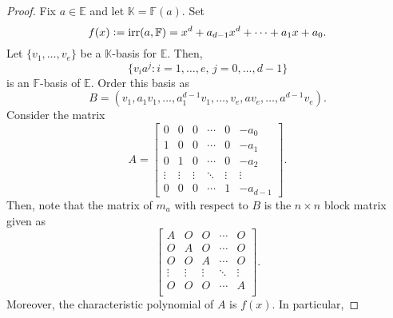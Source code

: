\normtracelinearmap*\label{prop:normtracelinearmap2}
\begin{flushright}\hyperref[prop:normtracelinearmap]{\upsym}\end{flushright}
\begin{proof}
    Fix $a \in \mathbb{E}$ and let $\mathbb{K} = \mathbb{F}(a).$ Set
    \begin{equation*} 
        f(x) \vcentcolon= \operatorname{irr}(a, \mathbb{F}) = x^d + a_{d - 1}x^d + \cdots + a_1x + a_0.
    \end{equation*}
    Let $\{v_1, \ldots, v_e\}$ be a $\mathbb{K}$-basis for $\mathbb{E}.$ Then,
    \begin{equation*} 
        \{v_ia^j : i = 1, \ldots, e,\, j = 0, \ldots, d - 1\}
    \end{equation*}
    is an $\mathbb{F}$-basis of $\mathbb{E}.$ Order this basis as
    \begin{equation*} 
        B = (v_1, a_1v_1, \ldots, a_1^{d - 1}v_1, \ldots, v_e, av_e, \ldots, a^{d - 1}v_e).
    \end{equation*}
    Consider the matrix
    \begin{equation*} 
        A = \begin{bmatrix}
            0 & 0 & 0 & \cdots & 0 & -a_0 \\
            1 & 0 & 0 & \cdots & 0 & -a_1 \\
            0 & 1 & 0 & \cdots & 0 & -a_2 \\
            \vdots & \vdots & \vdots & \ddots & \vdots & \vdots \\
            0 & 0 & 0 & \cdots & 1 & -a_{d - 1}
        \end{bmatrix}.
    \end{equation*}
    Then, note that the matrix of $m_a$ with respect to $B$ is the $n \times n$ block matrix given as
    \begin{equation*} 
        \begin{bmatrix}
            A & O & O & \cdots & O \\
            O & A & O & \cdots & O \\
            O & O & A & \cdots & O \\
            \vdots & \vdots & \vdots & \ddots & \vdots \\
            O & O & O & \cdots & A \\
        \end{bmatrix}.
    \end{equation*}
    Moreover, the characteristic polynomial of $A$ is $f(x).$ In particular,

\end{proof}

